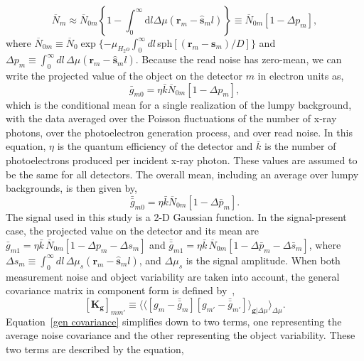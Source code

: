 %
\begin{equation}
\label{xrayeqnapprox}
\overline{N}_m \approx \overline{N}_{0m} \left\{1-\int_{0}^{\infty} \mathrm{d}l \Delta\mu(\mathbf{r}_m - \mathbf{\hat{s}}_ml)\right\} \equiv \overline{N}_{0m}[1-\Delta p_m],
\end{equation}
%
where $\overline{N}_{0m} \equiv \overline{N}_0 \exp\{-\mu_{H_2o} \int_0^{\infty} dl\,$sph$[(\mathbf{r}_m-\mathbf{s}_m )/D] \} $ and $\Delta p_m \equiv \int_0^{\infty} dl \, \Delta \mu(\mathbf{r}_m-\mathbf{\hat{s}}_m l)$.  Because the read noise has zero-mean, we can write the projected value of the object on the detector $m$ in electron units as,
%
\begin{equation}
\label{gbar}
\bar{g}_{m0} = \eta \bar{k}\overline{N}_{0m}[1-\Delta p_m],
\end{equation}
% 
which is the conditional mean for a single realization of the lumpy background, with the data averaged over the Poisson fluctuations of the number of x-ray photons, over the photoelectron generation process, and over read noise.  In this equation, $\eta$ is the quantum efficiency of the detector and $\bar{k}$ is the number of photoelectrons produced per incident x-ray photon.  These values are assumed to be the same for all detectors.  The overall mean, including an average over lumpy backgrounds, is then given by,
%
\begin{equation}
\label{gdoublebar}
\bar{\bar{g}}_{m0} = \eta\bar{k}\overline{N}_{0m}[1-\Delta \bar{p}_m].
\end{equation}
%
The signal used in this study is a 2-D Gaussian function.  In the signal-present case, the projected value on the detector and its mean are $\bar{g}_{m1} = \eta \bar{k}\, \overline{N}_{0m}[1 - \Delta p_m - \Delta s_m]$ and $ \bar{\bar{g}}_{m1} = \eta\bar{k}\, \overline{N}_{0m}[1 - \Delta \bar{p}_m - \Delta\bar{s}_m]$,  where $\Delta s_m \equiv \int_0^{\infty}dl \, \Delta \mu_s (\mathbf{r}_m - \mathbf{\hat{s}}_m l)$, and $\Delta\mu_s$ is the signal amplitude.
When both measurement noise and object variability are taken into account, the general covariance matrix in component form is defined by~\citep{Barrett2004},
%
\begin{equation}
\label{gen covariance}
[\mathbf{K_g}]_{mm'} \equiv \langle \langle[g_m-\bar{\bar{g}}_m][g_{m'}-\bar{\bar{g}}_{m'}]\rangle_{\mathbf{g}|\Delta\mu} \rangle_{\Delta\mu}.
\end{equation}
%
Equation~\ref{gen covariance} simplifies down to two terms, one representing the average noise covariance and the other representing the object variability.  These two terms are described by the equation,

